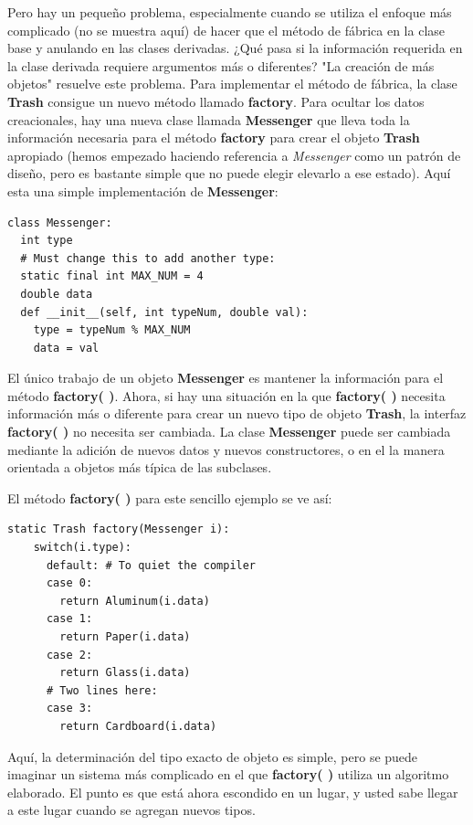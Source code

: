 \documentclass{article}
\begin{document}
Pero hay un pequeño problema, especialmente cuando se utiliza el enfoque más complicado (no se muestra aquí) de hacer que el método de fábrica en la clase base y anulando en las clases derivadas. ¿Qué pasa si la información requerida en la clase derivada requiere argumentos más o diferentes? "La creación de más objetos" resuelve este problema. Para implementar el método de fábrica, la clase \textbf{Trash} consigue un nuevo método llamado \textbf{factory}. Para ocultar los datos creacionales, hay una nueva clase llamada \textbf{Messenger} que lleva toda la información necesaria para el método \textbf{factory} para crear el objeto \textbf{Trash} apropiado (hemos empezado haciendo referencia a \textit{Messenger} como un patrón de diseño, pero es bastante simple que no puede elegir elevarlo a ese estado). Aquí esta una simple implementación de \textbf{Messenger}:     \newline

\begin{lstlisting}
class Messenger: 
  int type 
  # Must change this to add another type: 
  static final int MAX_NUM = 4 
  double data 
  def __init__(self, int typeNum, double val): 
    type = typeNum % MAX_NUM 
    data = val 
\end{lstlisting}

El único trabajo de un objeto \textbf{Messenger} es mantener la información para el método \textbf{factory( )}. Ahora, si hay una situación en la que \textbf{factory( )} necesita información más o diferente para crear un nuevo tipo de objeto \textbf{Trash}, la interfaz \textbf{factory( )} no necesita ser cambiada. La clase \textbf{Messenger} puede ser cambiada mediante la adición de nuevos datos y nuevos constructores, o en el la manera orientada a objetos más típica de las subclases.   \newline

El método \textbf{factory( )} para este sencillo ejemplo se ve así:     \newline

\begin{lstlisting}
static Trash factory(Messenger i): 
    switch(i.type): 
      default: # To quiet the compiler 
      case 0: 
        return Aluminum(i.data) 
      case 1: 
        return Paper(i.data) 
      case 2: 
        return Glass(i.data) 
      # Two lines here: 
      case 3:  
        return Cardboard(i.data)
\end{lstlisting}

Aquí, la determinación del tipo exacto de objeto es simple, pero se puede imaginar un sistema más complicado en el que \textbf{factory( )} utiliza un algoritmo elaborado. El punto es que está ahora escondido en un lugar, y usted sabe llegar a este lugar cuando se agregan nuevos tipos.  \newline
\end{document}
